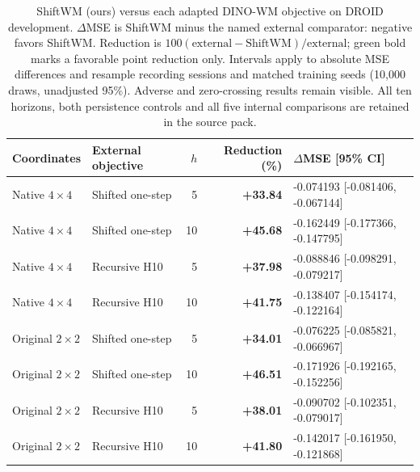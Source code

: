 \begin{table}[!htbp]\centering\small
\setlength{\tabcolsep}{4pt}
\begin{tabular}{@{}llrrl@{}}\toprule
Coordinates & External objective & $h$ & Reduction (\%) & $\Delta$MSE [95\% CI] \\ \midrule
Native $4\!\times\!4$ & Shifted one-step & 5 & \textcolor[RGB]{0,102,51}{\textbf{+33.84}} & -0.074193 [-0.081406, -0.067144] \\
Native $4\!\times\!4$ & Shifted one-step & 10 & \textcolor[RGB]{0,102,51}{\textbf{+45.68}} & -0.162449 [-0.177366, -0.147795] \\
Native $4\!\times\!4$ & Recursive H10 & 5 & \textcolor[RGB]{0,102,51}{\textbf{+37.98}} & -0.088846 [-0.098291, -0.079217] \\
Native $4\!\times\!4$ & Recursive H10 & 10 & \textcolor[RGB]{0,102,51}{\textbf{+41.75}} & -0.138407 [-0.154174, -0.122164] \\
Original $2\!\times\!2$ & Shifted one-step & 5 & \textcolor[RGB]{0,102,51}{\textbf{+34.01}} & -0.076225 [-0.085821, -0.066967] \\
Original $2\!\times\!2$ & Shifted one-step & 10 & \textcolor[RGB]{0,102,51}{\textbf{+46.51}} & -0.171926 [-0.192165, -0.152256] \\
Original $2\!\times\!2$ & Recursive H10 & 5 & \textcolor[RGB]{0,102,51}{\textbf{+38.01}} & -0.090702 [-0.102351, -0.079017] \\
Original $2\!\times\!2$ & Recursive H10 & 10 & \textcolor[RGB]{0,102,51}{\textbf{+41.80}} & -0.142017 [-0.161950, -0.121868] \\
\bottomrule\end{tabular}
\caption{ShiftWM (ours) versus each adapted DINO-WM objective on DROID development.
$\Delta$MSE is ShiftWM minus the named external comparator: negative favors ShiftWM.
Reduction is $100(\mathrm{external}-\mathrm{ShiftWM})/\mathrm{external}$;
green bold marks a favorable point reduction only. Intervals apply to absolute
MSE differences and resample recording sessions and matched training seeds
(10,000 draws, unadjusted 95\%). Adverse and zero-crossing results remain visible.
All ten horizons, both persistence controls and all five internal comparisons
are retained in the source pack.}
\label{tab:external-dinowm-contrasts}\end{table}
